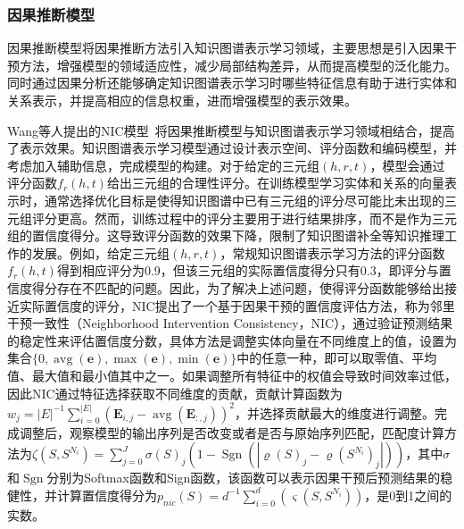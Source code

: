 \documentclass[algorithmlist, AutoFakeBold, AutoFakeSlant, figurelist, tablelist, nomlist, masters]{seuthesix}
\begin{document}
\subsubsection{因果推断模型}
因果推断模型将因果推断方法引入知识图谱表示学习领域，主要思想是引入因果干预方法，增强模型的领域适应性，减少局部结构差异，从而提高模型的泛化能力。同时通过因果分析还能够确定知识图谱表示学习时哪些特征信息有助于进行实体和关系表示，并提高相应的信息权重，进而增强模型的表示效果。

Wang等人提出的NIC模型~\cite{wang2021neighborhood}将因果推断模型与知识图谱表示学习领域相结合，提高了表示效果。知识图谱表示学习模型通过设计表示空间、评分函数和编码模型，并考虑加入辅助信息，完成模型的构建。对于给定的三元组$\left(h, r, t\right)$，模型会通过评分函数$f_r\left(h, t\right)$给出三元组的合理性评分。在训练模型学习实体和关系的向量表示时，通常选择优化目标是使得知识图谱中已有三元组的评分尽可能比未出现的三元组评分更高。然而，训练过程中的评分主要用于进行结果排序，而不是作为三元组的置信度得分。这导致评分函数的效果下降，限制了知识图谱补全等知识推理工作的发展。例如，给定三元组$\left(h, r, t\right)$，常规知识图谱表示学习方法的评分函数$f_r\left(h, t\right)$得到相应评分为0.9，但该三元组的实际置信度得分只有0.3，即评分与置信度得分存在不匹配的问题。因此，为了解决上述问题，使得评分函数能够给出接近实际置信度的评分，NIC提出了一个基于因果干预的置信度评估方法，称为邻里干预一致性（Neighborhood Intervention Consistency，NIC），通过验证预测结果的稳定性来评估置信度分数，具体方法是调整实体向量在不同维度上的值，设置为集合$\{0, \operatorname{avg}(\bm{e}), \max (\bm{e}), \min (\bm{e})\}$中的任意一种，即可以取零值、平均值、最大值和最小值其中之一。如果调整所有特征中的权值会导致时间效率过低，因此NIC通过特征选择获取不同维度的贡献，贡献计算函数为$w_j=|E|^{-1} \sum_{i=0}^{|E|}\left(\mathbf{E}_{i, j}-\operatorname{avg}\left(\mathbf{E}_{:, j}\right)\right)^2$，并选择贡献最大的维度进行调整。完成调整后，观察模型的输出序列是否改变或者是否与原始序列匹配，匹配度计算方法为$\zeta\left(S, S^{N_i}\right)=\sum_{j=0}^J \sigma(S)_j\left(1-\operatorname{Sgn}\left(\left|\varrho(S)_j-\varrho\left(S^{N_i}\right)_j\right|\right)\right)$，其中$\sigma$和$\operatorname{Sgn}$分别为Softmax函数和Sign函数，该函数可以表示因果干预后预测结果的稳健性，并计算置信度得分为$p_{n i c}(S)=d^{-1} \sum_{i=0}^d\left(\varsigma\left(S, S^{N_i}\right)\right)$，是0到1之间的实数。
\end{document}
